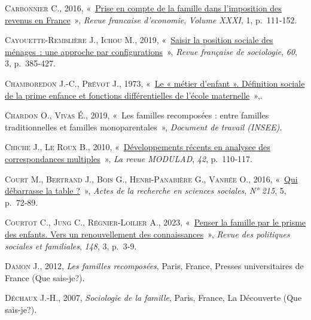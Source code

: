 \documentclass[
  12pt,
]{book}
\newlength{\cslhangindent}
\newenvironment{CSLReferences}[2] %
 {\begin{list}{}{%
  \setlength{\itemindent}{0pt}
  \setlength{\leftmargin}{0pt}
  \setlength{\parsep}{0pt}
  \ifodd #1
   \setlength{\leftmargin}{\cslhangindent}
   \setlength{\itemindent}{-1\cslhangindent}
  \fi
  \setlength{\itemsep}{#2\baselineskip}}}
 {\end{list}}
\begin{document}
\begin{CSLReferences}{0}{1}
\textsc{Carbonnier C.}, 2016,
{«~\href{https://www.cairn.info/revue-francaise-d-economie-2016-1-page-111.htm}{Prise
en compte de la famille dans l{'}imposition des revenus en France}~»},
\emph{Revue francaise d'economie}, \emph{Volume XXXI}, 1, p.~111‑152.

\textsc{Cayouette-Remblière J.}, \textsc{Ichou M.}, 2019,
{«~\href{https://doi.org/10.3917/rfs.603.0385}{Saisir la position
sociale des ménages~: une approche par configurations}~»}, \emph{Revue
française de sociologie}, \emph{60}, 3, p.~385‑427.

\textsc{Chamboredon J.-C.}, \textsc{Prévot J.}, 1973,
{«~\href{https://doi.org/10.2307/3320469}{Le « métier d'enfant ».
Définition sociale de la prime enfance et fonctions différentielles de
l'école maternelle}~»},.

\textsc{Chardon O.}, \textsc{Vivas É.}, 2019, {«~Les familles
recomposées : entre familles traditionnelles et familles
monoparentales~»}, \emph{Document de travail (INSEE)}.

\textsc{Chiche J.}, \textsc{Le Roux B.}, 2010,
{«~\href{https://hal.science/hal-00625921}{Développements récents en
analysee des correspondances multiples}~»}, \emph{La revue MODULAD},
\emph{42}, p.~110‑117.

\textsc{Court M.}, \textsc{Bertrand J.}, \textsc{Bois G.},
\textsc{Henri-Panabière G.}, \textsc{Vanhée O.}, 2016,
{«~\href{http://www.cairn.info/revue-actes-de-la-recherche-en-sciences-sociales-2016-5-page-72.htm}{Qui
débarrasse la table ?}~»}, \emph{Actes de la recherche en sciences
sociales}, \emph{N° 215}, 5, p.~72‑89.

\textsc{Courtot C.}, \textsc{Jung C.}, \textsc{Régnier-Loilier A.},
2023, {«~\href{https://doi.org/10.3917/rpsf.148.0003}{Penser la famille
par le prisme des enfants. Vers un renouvellement des connaissances}~»},
\emph{Revue des politiques sociales et familiales}, \emph{148}, 3,
p.~3‑9.

\textsc{Damon J.}, 2012, \emph{Les familles recomposées}, Paris, France,
Presses universitaires de France (Que sais-je?).

\textsc{Déchaux J.-H.}, 2007, \emph{Sociologie de la famille}, Paris,
France, La Découverte (Que sais-je?).


\end{CSLReferences}
\end{document}
